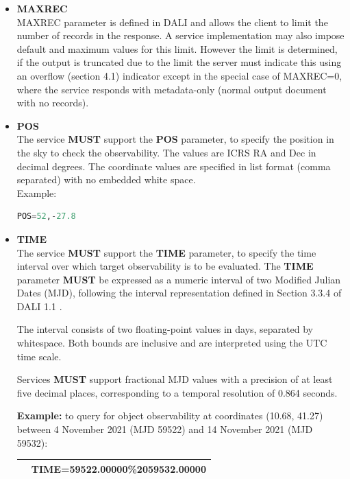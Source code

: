 \documentclass[11pt,a4paper]{ivoatex/ivoa}
\begin{document}
\begin{itemize}
\item{\textbf{MAXREC}\\MAXREC parameter is defined in DALI and allows
the client to limit the number of records in the response. A service
implementation may also impose default and maximum values for this limit.
However the limit is determined, if the output is truncated due to the
limit the server must indicate this using an overflow (section 4.1)
indicator except in the special case of MAXREC=0, where the service
responds with metadata-only (normal output document with no records).}

\item{\textbf{POS}\\The service \textbf{MUST }support the
\textbf{POS} parameter, to specify the position in the sky to check the observability. 
The values are ICRS RA and Dec in decimal degrees. The coordinate values are specified in list format (comma separated) with no embedded white
space.\\
Example:\\
\begin{lstlisting}[language=SQL]
POS=52,-27.8
\end{lstlisting}
}

\item{\textbf{TIME}\\The service \textbf{MUST} support the
\textbf{TIME} parameter, to specify the time interval over which target observability is
to be evaluated. The \textbf{TIME} parameter \textbf{MUST} be expressed as a numeric
interval of two Modified Julian Dates (MJD), following
the interval representation defined in Section 3.3.4
of DALI 1.1 \citep{2017ivoa.spec.0517D}.

The interval consists of two floating-point values
in days, separated by whitespace. Both bounds are
inclusive and are interpreted using the UTC time scale.

Services \textbf{MUST} support fractional MJD values with a
precision of at least five decimal places, corresponding
to a temporal resolution of 0.864 seconds.

\textbf{Example:} to query for object observability at coordinates
(10.68, 41.27) between 4 November 2021 (MJD 59522)
and 14 November 2021 (MJD 59532):\\

\begin{table}[h]
\centering
\begin{tabular}{|l|l|}
\hline
\begin{lstlisting}[language=SQL]
http://xmmvischeck.esac.esa.int:8080/objobssap/query?
POS=10.68,41.27&TIME=59522.00000\%2059532.00000
\end{lstlisting}
\\
\hline
\end{tabular}
\end{table}

}
\end{itemize}
\end{document}
